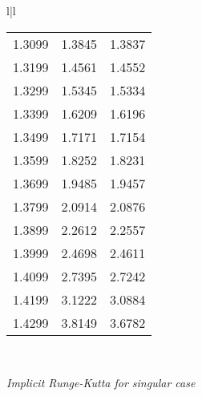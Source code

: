 \begin{figure}
\begin{tabular}{l|l}
\begin{tabular}{ccc}
            1.3099 & 1.3845 & 1.3837 \\
            1.3199 & 1.4561 & 1.4552 \\
            1.3299 & 1.5345 & 1.5334 \\
            1.3399 & 1.6209 & 1.6196 \\
            1.3499 & 1.7171 & 1.7154 \\
            1.3599 & 1.8252 & 1.8231 \\
            1.3699 & 1.9485 & 1.9457 \\
            1.3799 & 2.0914 & 2.0876 \\
            1.3899 & 2.2612 & 2.2557 \\
            1.3999 & 2.4698 & 2.4611 \\
            1.4099 & 2.7395 & 2.7242 \\
            1.4199 & 3.1222 & 3.0884 \\
            1.4299 & 3.8149 & 3.6782 \\
        \end{tabular}
        \\
    \end{tabular}
    \caption{\textit{Implicit Runge-Kutta for singular case }}
    \label{fig:06_13}
\end{figure}